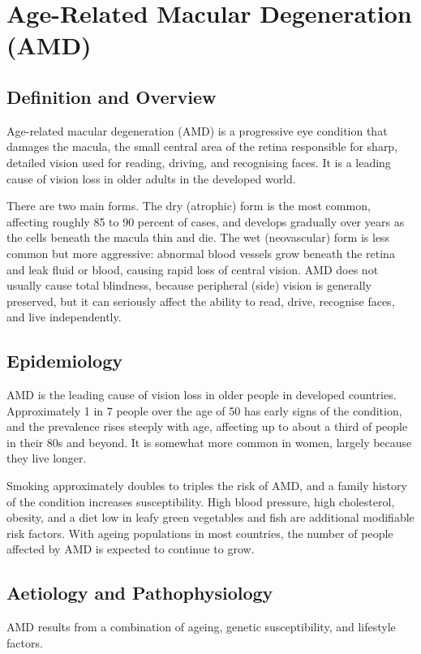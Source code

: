 \chapter{Age-Related Macular Degeneration (AMD)}

\section*{Definition and Overview}
Age-related macular degeneration (AMD) is a progressive eye condition that damages the macula, the small central area of the retina responsible for sharp, detailed vision used for reading, driving, and recognising faces. It is a leading cause of vision loss in older adults in the developed world.

There are two main forms. The dry (atrophic) form is the most common, affecting roughly 85 to 90 percent of cases, and develops gradually over years as the cells beneath the macula thin and die. The wet (neovascular) form is less common but more aggressive: abnormal blood vessels grow beneath the retina and leak fluid or blood, causing rapid loss of central vision. AMD does not usually cause total blindness, because peripheral (side) vision is generally preserved, but it can seriously affect the ability to read, drive, recognise faces, and live independently.

\section*{Epidemiology}
AMD is the leading cause of vision loss in older people in developed countries. Approximately 1 in 7 people over the age of 50 has early signs of the condition, and the prevalence rises steeply with age, affecting up to about a third of people in their 80s and beyond. It is somewhat more common in women, largely because they live longer.

Smoking approximately doubles to triples the risk of AMD, and a family history of the condition increases susceptibility. High blood pressure, high cholesterol, obesity, and a diet low in leafy green vegetables and fish are additional modifiable risk factors. With ageing populations in most countries, the number of people affected by AMD is expected to continue to grow.

\section*{Aetiology and Pathophysiology}
AMD results from a combination of ageing, genetic susceptibility, and lifestyle factors.

